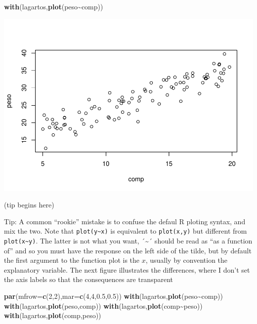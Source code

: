 \documentclass[
]{book}
\newenvironment{Shaded}{\begin{snugshade}}{\end{snugshade}}
\newcommand{\AttributeTok}[1]{\textcolor[rgb]{0.13,0.29,0.53}{#1}}
\newcommand{\DecValTok}[1]{\textcolor[rgb]{0.00,0.00,0.81}{#1}}
\newcommand{\FloatTok}[1]{\textcolor[rgb]{0.00,0.00,0.81}{#1}}
\newcommand{\FunctionTok}[1]{\textcolor[rgb]{0.13,0.29,0.53}{\textbf{#1}}}
\newcommand{\NormalTok}[1]{#1}
\newcommand{\SpecialCharTok}[1]{\textcolor[rgb]{0.81,0.36,0.00}{\textbf{#1}}}
\begin{document}
\begin{Shaded}
\begin{Highlighting}[]
\FunctionTok{with}\NormalTok{(lagartos,}\FunctionTok{plot}\NormalTok{(peso}\SpecialCharTok{\textasciitilde{}}\NormalTok{comp))}
\end{Highlighting}
\end{Shaded}

\includegraphics{ECOMODbook_files/figure-latex/a6.2-1.pdf}

(tip begins here)

Tip: A common ``rookie'' mistake is to confuse the defaul R ploting syntax, and mix the two. Note that \texttt{plot(y\textasciitilde{}x)} is equivalent to \texttt{plot(x,y)} but different from \texttt{plot(x\textasciitilde{}y)}. The latter is not what you want, ´\textasciitilde´ should be read as ``as a function of'' and so you must have the response on the left side of the tilde, but by default the first argument to the function plot is the \(x\), usually by convention the explanatory variable. The next figure illustrates the differences, where I don't set the axis labels so that the consequences are transparent

\begin{Shaded}
\begin{Highlighting}[]
\FunctionTok{par}\NormalTok{(}\AttributeTok{mfrow=}\FunctionTok{c}\NormalTok{(}\DecValTok{2}\NormalTok{,}\DecValTok{2}\NormalTok{),}\AttributeTok{mar=}\FunctionTok{c}\NormalTok{(}\DecValTok{4}\NormalTok{,}\DecValTok{4}\NormalTok{,}\FloatTok{0.5}\NormalTok{,}\FloatTok{0.5}\NormalTok{))}
\FunctionTok{with}\NormalTok{(lagartos,}\FunctionTok{plot}\NormalTok{(peso}\SpecialCharTok{\textasciitilde{}}\NormalTok{comp))}
\FunctionTok{with}\NormalTok{(lagartos,}\FunctionTok{plot}\NormalTok{(peso,comp))}
\FunctionTok{with}\NormalTok{(lagartos,}\FunctionTok{plot}\NormalTok{(comp}\SpecialCharTok{\textasciitilde{}}\NormalTok{peso))}
\FunctionTok{with}\NormalTok{(lagartos,}\FunctionTok{plot}\NormalTok{(comp,peso))}
\end{Highlighting}
\end{Shaded}
\end{document}

